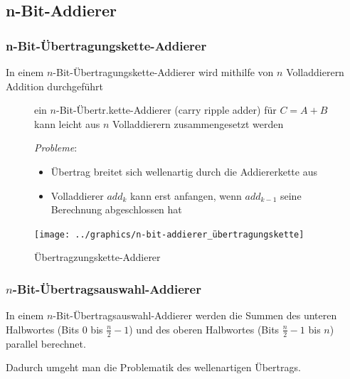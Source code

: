 \documentclass[12pt]{report}
\begin{document}
\subsection{n-Bit-Addierer}
\subsubsection{n-Bit-Übertragungskette-Addierer}
\begin{defbox}
  In einem $n$-Bit-Übertragungskette-Addierer wird mithilfe von $n$ Volladdierern Addition durchgeführt
\end{defbox}
\begin{figure}[H]
  \begin{minipage}[t]{.45\textwidth}
    ein $n$-Bit-Übertr.kette-Addierer (carry ripple adder) für $C = A + B$
    kann leicht aus $n$ Volladdierern zusammengesetzt werden\\
    \par \textit{Probleme}:
    \begin{itemize}
      \item Übertrag breitet sich wellenartig durch die Addiererkette aus
      \item Volladdierer $add_k$ kann erst anfangen, wenn $add_{k-1}$ seine Berechnung abgeschlossen hat
    \end{itemize}
  \end{minipage}
  \hfill
  \begin{minipage}[t]{.45\textwidth}
    \caption{Übertragzungskette-Addierer}
    \centering
    \vspace{0pt}
    \texttt{[image: ../graphics/n-bit-addierer\_übertragungskette]}
  \end{minipage}
\end{figure}

\subsubsection{$n$-Bit-Übertragsauswahl-Addierer}
\begin{defbox}
  In einem $n$-Bit-Übertragsauswahl-Addierer werden die Summen des unteren Halbwortes (Bits 0 bis $\frac{n}{2}-1$) und 
  des oberen Halbwortes (Bits $\frac{n}{2}-1$ bis $n$) parallel berechnet.
  
  Dadurch umgeht man die Problematik des wellenartigen Übertrags.
\end{defbox}
\end{document}
